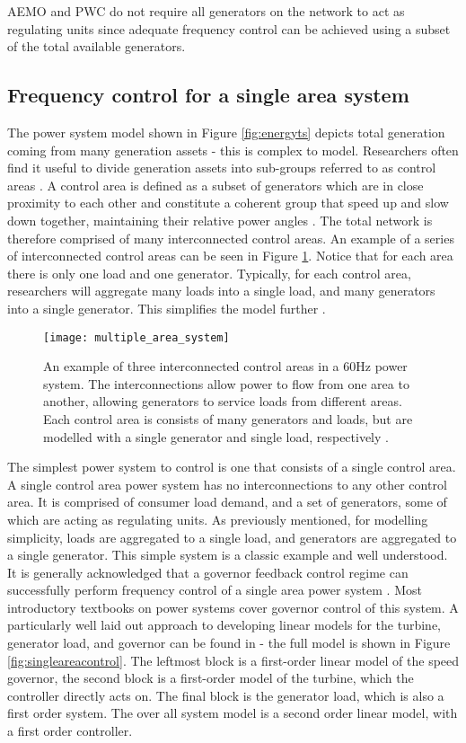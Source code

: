 AEMO and PWC do not require all generators on the network to act as regulating units since adequate frequency control can be achieved using a subset of the total available generators.

\subsection{Frequency control for a single area system}\label{oneareapowersystem}
The power system model shown in Figure \ref{fig:energyts} depicts total generation coming from many generation assets - this is complex to model. Researchers often find it useful to divide generation assets into sub-groups referred to as control areas \cite{Kothari2011}. A control area is defined as a subset of generators which are in close proximity to each other and constitute a coherent group that speed up and slow down together, maintaining their relative power angles \cite{Kothari2011}. The total network is therefore comprised of many interconnected control areas. An example of a series of interconnected control areas can be seen in Figure \ref{fig:interconnectedpa}. Notice that for each area there is only one load and one generator. Typically, for each control area, researchers will aggregate many loads into a single load, and many generators into a single generator. This simplifies the model further \cite{Grainger1994}.
\begin{figure}[ht]
	\centering
	\texttt{[image: multiple\_area\_system]}
	\caption{An example of three interconnected control areas in a 60$\si{\hertz}$ power system. The interconnections allow power to flow from one area to another, allowing generators to service loads from different areas. Each control area is consists of many generators and loads, but are modelled with a single generator and single load, respectively \cite{Grainger1994}.}
	\label{fig:interconnectedpa}
\end{figure}

The simplest power system to control is one that consists of a single control area. A single control area power system has no interconnections to any other control area. It is comprised of consumer load demand, and a set of generators, some of which are acting as regulating units. As previously mentioned, for modelling simplicity, loads are aggregated to a single load, and generators are aggregated to a single generator. This simple system is a classic example and well understood. It is generally acknowledged that a governor feedback control regime can successfully perform frequency control of a single area power system \cite{Wood2013, Grainger1994, Kothari2011}. Most introductory textbooks on power systems cover governor control of this system. A particularly well laid out approach to developing linear models for the turbine, generator load, and governor can be found in \cite{Kothari2011} - the full model is shown in Figure \ref{fig:singleareacontrol}. The leftmost block is a first-order linear model of the speed governor, the second block is a first-order model of the turbine, which the controller directly acts on. The final block is the generator load, which is also a first order system. The over all system model is a second order linear model, with a first order controller.

